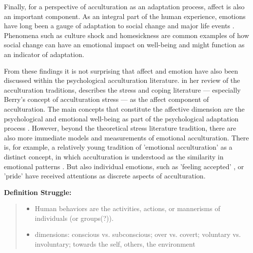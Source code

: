 \documentclass[nobib]{tufte-handout}
\begin{document}
Finally, for a perspective of acculturation as an adaptation process, affect is also an important component. As an integral part of the human experience, emotions have long been a gauge of adaptation to social change and major life events \citep[e.g.,][]{Smith1990, Pacella2017}. Phenomena such as culture shock \citep{Ward2001a} and homesickness \citep{VanTilburg1996} are common examples of how social change can have an emotional impact on well-being and might function as an indicator of adaptation. 

From these findings it is not surprising that affect and emotion have also been discussed within the psychological acculturation literature. \citet{Ward2001} in her review of the acculturation traditions, describes the stress and coping literature --- especially Berry's concept of acculturation stress \citep{Berry1997b} --- as the affect component of acculturation. The main concepts that constitute the affective dimension are the psychological and emotional well-being as part of the psychological adaptation process \citep[including, for example life satisfaction and depression][]{Ward2019}. However, beyond the theoretical stress literature tradition, there are also more immediate models and measurements of emotional acculturation. There is, for example, a relatively young tradition of 'emotional acculturation' as a distinct concept, in which acculturation is understood as the similarity in emotional patterns \citep[see][for a review]{DeLeersnyder2017}. But also individual emotions, such as 'feeling accepted' \citep{Jasini2018}, or 'pride' \citep{Suinn1995} have received attentions as discrete aspects of acculturation. 

\begin{framed}
    \textbf{Definition Struggle:}\\ 
    \begin{quote}
        \begin{itemize}
            \item Human behaviors are the activities, actions, or mannerisms of individuals (or groups(?)).
            \item dimensions: conscious vs. subconscious; over vs. covert; voluntary vs. involuntary; towards the self, others, the environment 
        \end{itemize}
    \end{quote}
\end{framed}
\end{document}

